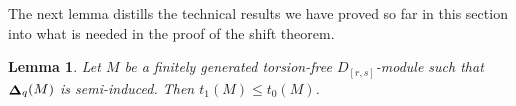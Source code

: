 \documentclass[12pt]{amsart}
\DeclareMathOperator{\Tor}{Tor}
\DeclareMathOperator{\De}{\bf{\Delta}}
\newcommand{\Dr}{D^{(r)}}
\newcommand{\Drs}{D_{[r,s]}}
\newcommand{\mDeq}{\De_{q}}
\numberwithin{equation}{section}
\newtheorem{lemma}[equation]{Lemma}
\theoremstyle{definition}
\theoremstyle{plain}
\begin{document}


The next lemma distills the technical results we have proved so far in this section into what is needed in the proof of the shift theorem.
\begin{lemma}\label{lem:t1lesst0}
    Let $M$ be a finitely generated torsion-free $\Drs$-module such that $\mDeq(M)$ is semi-induced. Then $t_1(M) \leq t_0(M)$.
\end{lemma}
\end{document}
